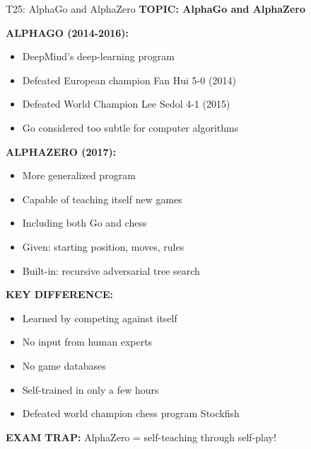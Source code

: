 \documentclass[8pt]{beamer}
\begin{document}
	\begin{frame}{T25: AlphaGo and AlphaZero}
		\fontsize{6.5}{7.5}\selectfont
		\textbf{TOPIC: AlphaGo and AlphaZero}
		
		\vspace{0.1cm}
		\textbf{ALPHAGO (2014-2016):}
		\begin{itemize}
			\item DeepMind's deep-learning program
			\item Defeated European champion Fan Hui 5-0 (2014)
			\item Defeated World Champion Lee Sedol 4-1 (2015)
			\item Go considered too subtle for computer algorithms
		\end{itemize}
		
		\vspace{0.1cm}
		\textbf{ALPHAZERO (2017):}
		\begin{itemize}
			\item More generalized program
			\item Capable of teaching itself new games
			\item Including both Go and chess
			\item Given: starting position, moves, rules
			\item Built-in: recursive adversarial tree search
		\end{itemize}
		
		\vspace{0.1cm}
		\textbf{KEY DIFFERENCE:}
		\begin{itemize}
			\item Learned by competing against itself
			\item No input from human experts
			\item No game databases
			\item Self-trained in only a few hours
			\item Defeated world champion chess program Stockfish
		\end{itemize}
		
		\textcolor{myred}{\textbf{EXAM TRAP:}} AlphaZero = \textcolor{myblue}{self-teaching through self-play}!
	\end{frame}
	
\end{document}
